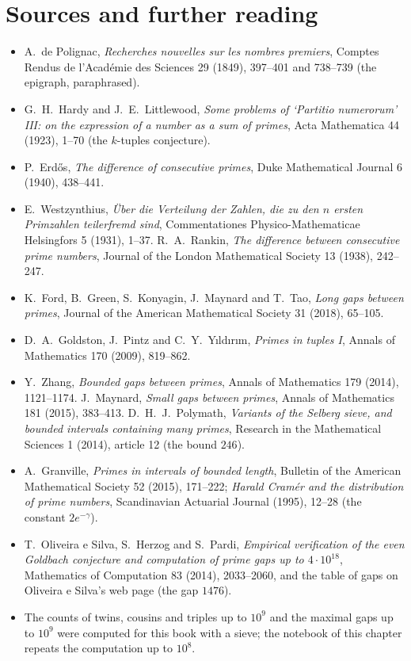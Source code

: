 \section*{Sources and further reading}

\begin{itemize}
\item A.~de Polignac, \emph{Recherches nouvelles sur les nombres premiers}, Comptes Rendus de l'Acad\'emie des Sciences 29 (1849), 397--401 and
738--739 (the epigraph, paraphrased).
\item G.~H.~Hardy and J.~E.~Littlewood, \emph{Some problems of `Partitio numerorum' III: on the expression of a number as a sum of primes}, Acta
Mathematica 44 (1923), 1--70 (the $k$-tuples conjecture).
\item P.~Erd\H{o}s, \emph{The difference of consecutive primes}, Duke Mathematical Journal 6 (1940), 438--441.
\item E.~Westzynthius, \emph{\"Uber die Verteilung der Zahlen, die zu den $n$ ersten Primzahlen teilerfremd sind}, Commentationes Physico-Mathematicae
Helsingfors 5 (1931), 1--37. R.~A.~Rankin, \emph{The difference between consecutive prime numbers}, Journal of the London Mathematical Society 13 (1938),
242--247.
\item K.~Ford, B.~Green, S.~Konyagin, J.~Maynard and T.~Tao, \emph{Long gaps between primes}, Journal of the American Mathematical Society 31 (2018),
65--105.
\item D.~A.~Goldston, J.~Pintz and C.~Y.~Y\i ld\i r\i m, \emph{Primes in tuples I}, Annals of Mathematics 170 (2009), 819--862.
\item Y.~Zhang, \emph{Bounded gaps between primes}, Annals of Mathematics 179 (2014), 1121--1174. J.~Maynard, \emph{Small gaps between primes}, Annals of
Mathematics 181 (2015), 383--413. D.~H.~J.~Polymath, \emph{Variants of the Selberg sieve, and bounded intervals containing many primes}, Research in the
Mathematical Sciences 1 (2014), article 12 (the bound $246$).
\item A.~Granville, \emph{Primes in intervals of bounded length}, Bulletin of the American Mathematical Society 52 (2015), 171--222; \emph{Harald Cram\'er
and the distribution of prime numbers}, Scandinavian Actuarial Journal (1995), 12--28 (the constant $2e^{-\gamma}$).
\item T.~Oliveira e Silva, S.~Herzog and S.~Pardi, \emph{Empirical verification of the even Goldbach conjecture and computation of prime gaps up to
$4\cdot10^{18}$}, Mathematics of Computation 83 (2014), 2033--2060, and the table of gaps on Oliveira e Silva's web page (the gap $1476$).
\item The counts of twins, cousins and triples up to $10^9$ and the maximal gaps up to $10^9$ were computed for this book with a sieve; the notebook of
this chapter repeats the computation up to $10^8$.
\end{itemize}
